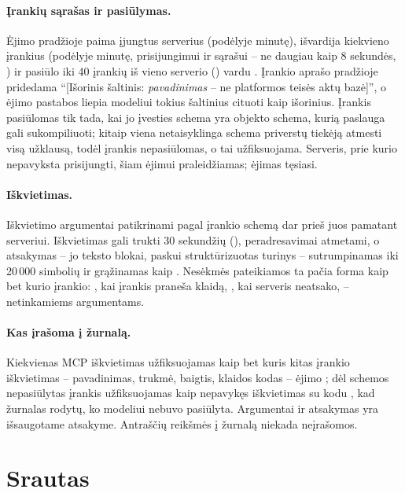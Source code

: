 \paragraph{Įrankių sąrašas ir pasiūlymas.} Ėjimo pradžioje  paima įjungtus
serverius (podėlyje minutę), išvardija kiekvieno įrankius (podėlyje minutę, prisijungimui ir
sąrašui -- ne daugiau kaip 8 sekundės, ) ir pasiūlo iki 40 įrankių iš
vieno serverio () vardu . Įrankio aprašo pradžioje
pridedama \enquote{[Išorinis šaltinis: \emph{pavadinimas} -- ne platformos teisės aktų bazė]}, o
ėjimo pastabos liepia modeliui tokius šaltinius cituoti kaip išorinius. Įrankis pasiūlomas tik
tada, kai jo įvesties schema yra objekto schema, kurią paslauga gali sukompiliuoti; kitaip viena
netaisyklinga schema priverstų tiekėją atmesti visą užklausą, todėl įrankis nepasiūlomas, o tai
užfiksuojama. Serveris, prie kurio nepavyksta prisijungti, šiam ėjimui praleidžiamas; ėjimas
tęsiasi.

\paragraph{Iškvietimas.} Iškvietimo argumentai patikrinami pagal įrankio schemą dar prieš juos
pamatant serveriui. Iškvietimas gali trukti 30 sekundžių (), peradresavimai
atmetami, o atsakymas -- jo teksto blokai, paskui struktūrizuotas turinys -- sutrumpinamas iki
20\,000 simbolių ir grąžinamas kaip . Nesėkmės pateikiamos ta pačia forma
kaip bet kurio įrankio: , kai įrankis praneša klaidą, ,
kai serveris neatsako,  -- netinkamiems argumentams.

\paragraph{Kas įrašoma į žurnalą.} Kiekvienas MCP iškvietimas užfiksuojamas kaip bet kuris kitas
įrankio iškvietimas -- pavadinimas, trukmė, baigtis, klaidos kodas -- ėjimo ;
dėl schemos nepasiūlytas įrankis užfiksuojamas kaip nepavykęs iškvietimas su kodu
, kad žurnalas rodytų, ko modeliui nebuvo pasiūlyta. Argumentai ir
atsakymas yra išsaugotame atsakyme. Antraščių reikšmės į žurnalą niekada neįrašomos.


\section{Srautas}\label{sec:chat:stream}

